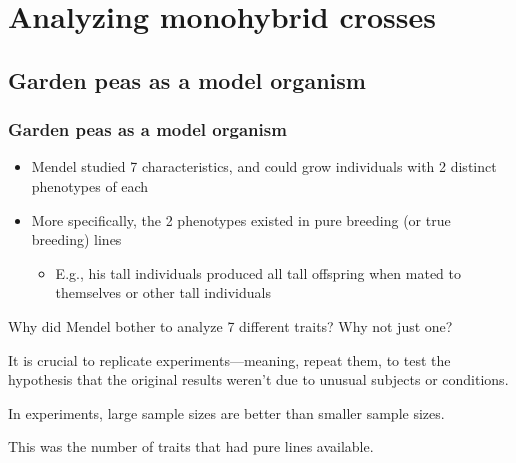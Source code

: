 \section{Analyzing monohybrid crosses}

\subsection{Garden peas as a model organism}

\begin{frame}
    \frametitle{Garden peas as a model organism}

    \begin{itemize}[<+->]
        \item Mendel studied 7 characteristics, and could grow individuals with
            2 distinct phenotypes of each

        \item More specifically, the 2 phenotypes existed in pure breeding (or
            true breeding) lines
            \begin{itemize}
                \item E.g., his tall individuals produced all tall offspring
                    when mated to themselves or other tall individuals
            \end{itemize}
    \end{itemize}
\end{frame}

\begin{frame}
    \begin{clickerquestion}
        \item Why did Mendel bother to analyze 7 different traits? Why not just
            one?
        \begin{clickeroptions}
            \item It is crucial to replicate experiments---meaning, repeat them,
                to test the hypothesis that the original results weren't due to
                unusual subjects or conditions.
            \item In experiments, large sample sizes are better than smaller
                sample sizes.
            \item This was the number of traits that had pure lines available.
            \item {}
        \end{clickeroptions}
    \end{clickerquestion}
\end{frame}

